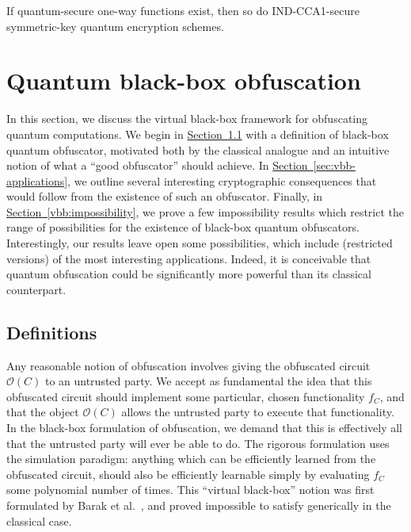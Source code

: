 \documentclass[envcountsame]{llncs}
\numberwithin{equation}{section}
\newcommand{\expref}[2]{\texorpdfstring{\hyperref[#2]{#1~\ref{#2}}}{#1~\ref{#2}}}
\newcommand{\algo}{\mathcal}
\begin{document}
\begin{theorem}\label{thm:qOWF-implies-qSKE}
If quantum-secure one-way functions exist, then so do IND-CCA1-secure symmetric-key quantum encryption schemes.
\end{theorem}

\section{Quantum black-box obfuscation}\label{sec:black-box}

In this section, we discuss the virtual black-box framework for obfuscating quantum computations. We begin in \expref{Section}{sec:vbb-definitions} with a definition of black-box quantum obfuscator, motivated both by the classical analogue and an intuitive notion of what a ``good obfuscator'' should achieve. In \expref{Section}{sec:vbb-applications}, we outline several interesting cryptographic consequences that would follow from the existence of such an obfuscator. Finally, in \expref{Section}{vbb:impossibility}, we prove a few impossibility results which restrict the range of possibilities for the existence of black-box quantum obfuscators. Interestingly, our results leave open some possibilities, which include (restricted versions) of the most interesting applications. Indeed, it is conceivable that quantum obfuscation could be significantly more powerful than its classical counterpart.

\subsection{Definitions}\label{sec:vbb-definitions}

Any reasonable notion of obfuscation involves giving the obfuscated circuit $\algo O(C)$ to an untrusted party. We accept as fundamental the idea that this obfuscated circuit should implement some particular, chosen functionality $f_C$, and that the object $\algo O(C)$ allows the untrusted party to execute that functionality. In the black-box formulation of obfuscation, we demand that this is effectively all that the untrusted party will ever be able to do. The rigorous formulation uses the simulation paradigm: anything which can be efficiently learned from the obfuscated circuit, should also be efficiently learnable simply by evaluating $f_C$ some polynomial number of times. This ``virtual black-box'' notion was first formulated by Barak et al.~\cite{BGIRSVY12}, and proved impossible to satisfy generically in the classical case.
\end{document}
